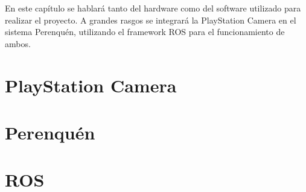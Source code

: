 
En este capítulo se hablará tanto del hardware como del software utilizado para
realizar el proyecto. A grandes rasgos se integrará la PlayStation Camera en el
sistema Perenquén, utilizando el framework ROS para el funcionamiento de ambos.


\section{PlayStation Camera}
\label{3:sec1}


\section{Perenquén}
\label{3:sec2}



\section{ROS}
\label{3:sec3}

